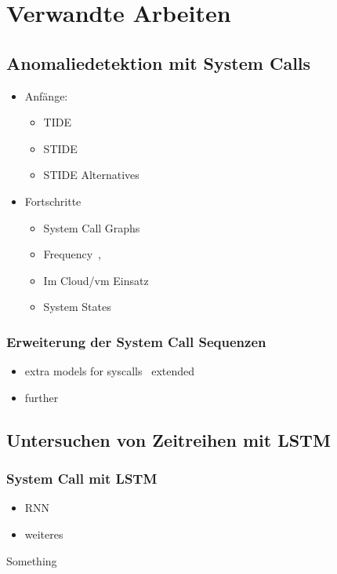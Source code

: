 \chapter{Verwandte Arbeiten}\label{ch:verwandte_arbeiten}
\section{Anomaliedetektion mit System Calls}

\begin{itemize}
    \item Anfänge:
        \begin{itemize}
            \item TIDE~\cite{FORREST}
            \item STIDE~\cite{STIDE}
            \item STIDE Alternatives~\cite{STIDE_Alternatives}
        \end{itemize}
    \item Fortschritte
        \begin{itemize}
            \item System Call Graphs~\cite{SYSCALL_GRAPHS}
            \item Frequency~\cite{FREQUENCY1},~\cite{FREQUENCY2}
            \item Im Cloud/vm Einsatz~\cite{VM}
            \item System States~\cite{SYSTEM_STATES}
        \end{itemize}
\end{itemize}

\subsection{Erweiterung der System Call Sequenzen}

\begin{itemize}
    \item extra models for syscalls~\cite{ARGUMENTS} extended~\cite{MAGGI}
    \item further~\cite{ARGUMENTS2}

\end{itemize}

\section{Untersuchen von Zeitreihen mit LSTM}

\subsection{System Call mit LSTM}
    \begin{itemize}
        \item RNN~\cite{RNN/CNN}
        \item weiteres
    \end{itemize}
    Something~\cite{LSTMsys}
